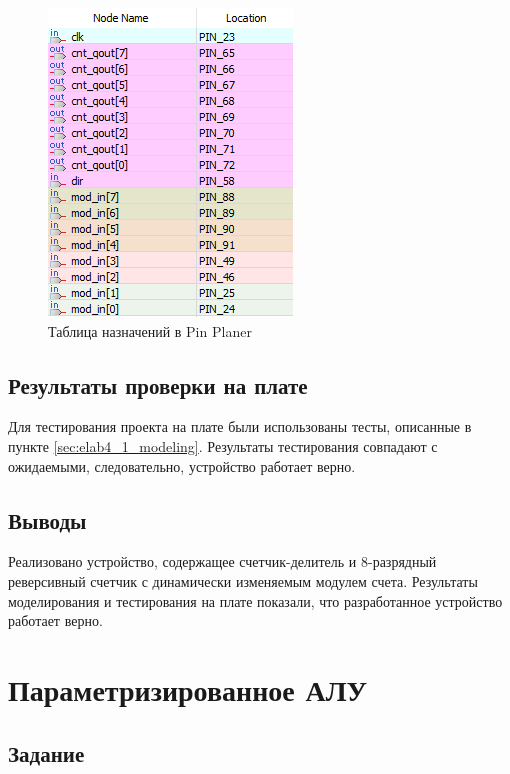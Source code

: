 \begin{figure}[H]
\begin{center}
	\includegraphics{elab4_1_pins}
	\caption{Таблица назначений в Pin Planer}
	\label{fig:elab4_1_pins}
\end{center}
\end{figure}

\subsection{Результаты проверки на плате}

Для тестирования проекта на плате были использованы тесты, описанные в пункте \ref{sec:elab4_1_modeling}. Результаты тестирования совпадают с ожидаемыми, следовательно, устройство работает верно.

\subsection{Выводы}

Реализовано устройство, содержащее счетчик-делитель и 8-разрядный реверсивный счетчик с динамически изменяемым модулем счета. Результаты моделирования и тестирования на плате показали, что разработанное устройство работает верно.

\newpage

\graphicspath{{../lab5/pics/}}

\section{Параметризированное АЛУ}

\subsection{Задание}

